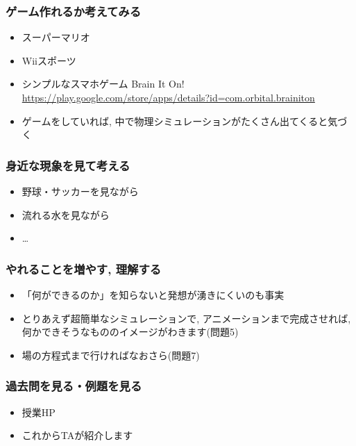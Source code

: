 \documentclass[12pt,dvipdfmx]{beamer}
\begin{document}
\begin{frame}
  \frametitle{ゲーム作れるか考えてみる}
  \begin{itemize}
  \item スーパーマリオ
  \item Wiiスポーツ
  \item シンプルなスマホゲーム Brain It On!
    \url{https://play.google.com/store/apps/details?id=com.orbital.brainiton}
  \item ゲームをしていれば,
    中で物理シミュレーションがたくさん出てくると気づく
  \end{itemize}
\end{frame}

\begin{frame}
  \frametitle{身近な現象を見て考える}
  \begin{itemize}
  \item 野球・サッカーを見ながら
  \item 流れる水を見ながら
  \item \ldots
  \end{itemize}
\end{frame}

\begin{frame}
  \frametitle{やれることを増やす, 理解する}
  \begin{itemize}
  \item 「何ができるのか」を知らないと発想が湧きにくいのも事実
  \item とりあえず超簡単なシミュレーションで,
    アニメーションまで完成させれば,
    何かできそうなもののイメージがわきます(問題5)
  \item 場の方程式まで行ければなおさら(問題7)
  \end{itemize}
\end{frame}


\begin{frame}
  \frametitle{過去問を見る・例題を見る}
  \begin{itemize}
  \item 授業HP
  \item これからTAが紹介します
  \end{itemize}
\end{frame}
\end{document}
